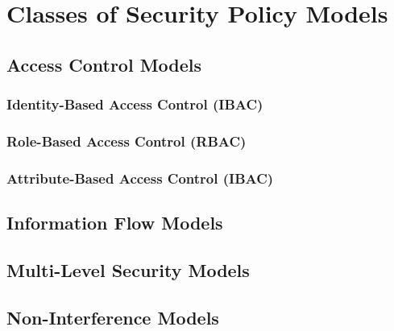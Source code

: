 \section{Classes of Security Policy Models}

\subsection{Access Control Models}
\subsubsection{Identity-Based Access Control (IBAC)}
\subsubsection{Role-Based Access Control (RBAC)}
\subsubsection{Attribute-Based Access Control (IBAC)}

\subsection{Information Flow Models}

\subsection{Multi-Level Security Models}

\subsection{Non-Interference Models}
